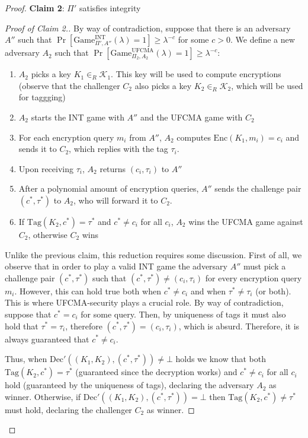 \documentclass[a4paper, 12pt]{report}
\begin{document}
\begin{proof}
        \textbf{Claim 2}: $\Pi'$ satisfies integrity

        \begin{proof}[Proof of Claim 2.]
            By way of contradiction, suppose that there is an adversary $A''$ such that $\Pr[\mathrm{Game}_{\Pi', A''}^{\text{INT}}(\lambda) = 1] \geq \lambda^{-c}$ for some $c > 0$. We define a new adversary $A_2$ such that $\Pr[\mathrm{Game}_{\Pi_2, A_2}^{\text{UFCMA}}(\lambda) = 1] \geq \lambda^{-c}$:
            \begin{enumerate}
                \item $A_2$ picks a key $K_1 \in_R \mathcal{K}_1$. This key will be used to compute encryptions (observe that the challenger $C_2$ also picks a key $K_2 \in_R \mathcal{K}_2$, which will be used for taggging)
                \item $A_2$ starts the INT game with $A''$ and the UFCMA game with $C_2$
                \item For each encryption query $m_i$ from $A''$, $A_2$ computes $\mathrm{Enc}(K_1, m_i) = c_i$ and sends it to $C_2$, which replies with the tag $\tau_i$. 
                \item Upon receiving $\tau_i$, $A_2$ returns $(c_i, \tau_i)$ to $A''$
                \item After a polynomial amount of encryption queries, $A''$ sends the challenge pair $(c^*, \tau^*)$ to $A_2$, who will forward it to $C_2$.
                \item If $\mathrm{Tag}(K_2, c^*) = \tau^*$ and $c^* \neq c_i$ for all $c_i$, $A_2$ wins the UFCMA game against $C_2$, otherwise $C_2$ wins
            \end{enumerate}

            Unlike the previous claim, this reduction requires some discussion. First of all, we observe that in order to play a valid INT game the adversary $A''$ must pick a challenge pair $(c^*, \tau^*)$ such that $(c^*, \tau^*) \neq (c_i, \tau_i)$ for every encryption query $m_i$. However, this can hold true both when $c^* \neq c_i$ and when $\tau^* \neq \tau_i$ (or both). This is where UFCMA-security plays a crucial role. By way of contradiction, suppose that $c^* = c_i$ for some query. Then, by uniqueness of tags it must also hold that $\tau^* = \tau_i$, therefore $(c^*, \tau^*) = (c_i, \tau_i)$, which is absurd. Therefore, it is always guaranteed that $c^* \neq c_i$. 

            Thus, when $\mathrm{Dec}'((K_1, K_2), (c^*, \tau^*)) \neq \bot$ holds we know that both $\mathrm{Tag}(K_2, c^*) = \tau^*$ (guaranteed since the decryption works) and $c^* \neq c_i$ for all $c_i$ hold (guaranteed by the uniqueness of tags), declaring the adversary $A_2$ as winner. Otherwise, if $\mathrm{Dec}'((K_1, K_2), (c^*, \tau^*)) = \bot$ then $\mathrm{Tag}(K_2, c^*) \neq \tau^*$ must hold, declaring the challenger $C_2$ as winner.
        \end{proof}
    \end{proof}
\end{document}
